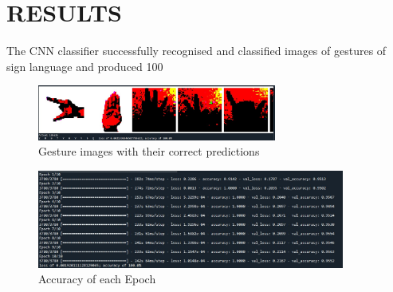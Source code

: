 \chapter{RESULTS}
The CNN classifier successfully recognised and classified images of gestures of sign language and produced 100%
\begin{figure} [h!]
\centering
\includegraphics[width=0.7\textwidth]{Accuracy 1.jpeg}
\caption{\label{fig:frog}Gesture images with their correct predictions}
\end{figure}
\begin{figure} [h!]
\centering
\includegraphics[width=0.9\textwidth]{Accuracy 2.jpeg}
\caption{\label{fig:frog}Accuracy of each Epoch}
\end{figure}